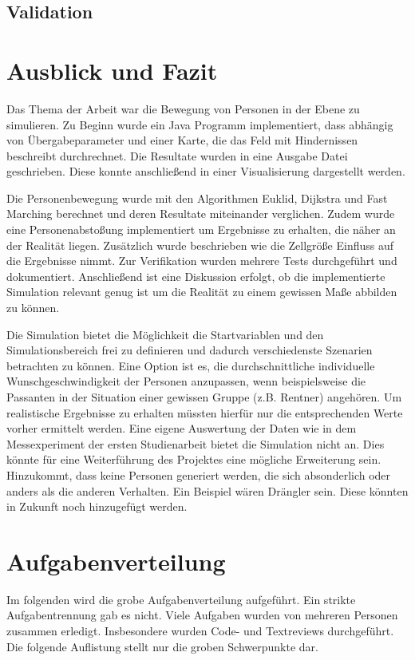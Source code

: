 


\subsection{Validation}

\section{Ausblick und Fazit}
Das Thema der Arbeit war die Bewegung von Personen in der Ebene zu simulieren. Zu Beginn wurde ein Java Programm implementiert, dass abhängig von Übergabeparameter und einer Karte, die das Feld mit Hindernissen beschreibt durchrechnet. Die Resultate wurden in eine Ausgabe Datei geschrieben. Diese konnte anschließend in einer Visualisierung dargestellt werden.

Die Personenbewegung wurde mit den Algorithmen Euklid, Dijkstra und Fast Marching berechnet und deren Resultate miteinander verglichen. Zudem wurde eine Personenabstoßung implementiert um  Ergebnisse zu erhalten, die näher an der Realität liegen. Zusätzlich wurde beschrieben wie die Zellgröße Einfluss auf die Ergebnisse nimmt. Zur Verifikation wurden mehrere Tests durchgeführt und dokumentiert. Anschließend ist eine Diskussion erfolgt, ob die implementierte Simulation relevant genug ist um die Realität zu einem gewissen Maße abbilden zu können.

Die Simulation bietet die Möglichkeit die Startvariablen und den Simulationsbereich frei zu definieren und dadurch verschiedenste Szenarien betrachten zu können. Eine Option ist es, die durchschnittliche individuelle Wunschgeschwindigkeit der Personen anzupassen, wenn beispielsweise die Passanten in der Situation einer gewissen Gruppe (z.B. Rentner) angehören. Um realistische Ergebnisse zu erhalten müssten hierfür nur die entsprechenden Werte vorher ermittelt werden. Eine eigene Auswertung der Daten wie in dem Messexperiment der ersten Studienarbeit bietet die Simulation nicht an. Dies könnte für eine Weiterführung des Projektes eine mögliche Erweiterung sein. Hinzukommt, dass keine Personen generiert werden, die sich absonderlich oder anders als die anderen Verhalten. Ein Beispiel wären Drängler sein. Diese könnten in Zukunft noch hinzugefügt werden.

\section{Aufgabenverteilung}
Im folgenden wird die grobe Aufgabenverteilung aufgeführt. Ein strikte Aufgabentrennung gab es nicht. Viele Aufgaben wurden von mehreren Personen zusammen erledigt. Insbesondere wurden Code- und Textreviews durchgeführt. Die folgende Auflistung stellt nur die groben Schwerpunkte dar.
 
